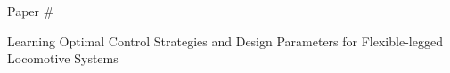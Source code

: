 \pagestyle{empty}
\setlength{\oddsidemargin}{0.0in}
\setlength{\evensidemargin}{0.0in}
\setlength{\marginparwidth}{0.0in}
\setlength{\topmargin}{0.0in}
\setlength{\headheight}{0.0in}
\setlength{\headsep}{0.2in}
\setlength{\textwidth}{6.5in}
\setlength{\textheight}{9.0in}
\setlength{\parindent}{0.0in}
\setlength{\parskip}{0.2in}

\def\confshortname{ULL E&T}
\def\confyear{2021}




\setlength{\baselineskip}{10pt}
{\scriptsize{\hvb
\begin{flushright}
Paper \#      %
\end{flushright}
}}

{\footnotesize{\hvb
Learning Optimal Control Strategies and Design Parameters for Flexible-legged Locomotive Systems
}}

\vspace{10pt}
\setlength{\baselineskip}{11pt}

